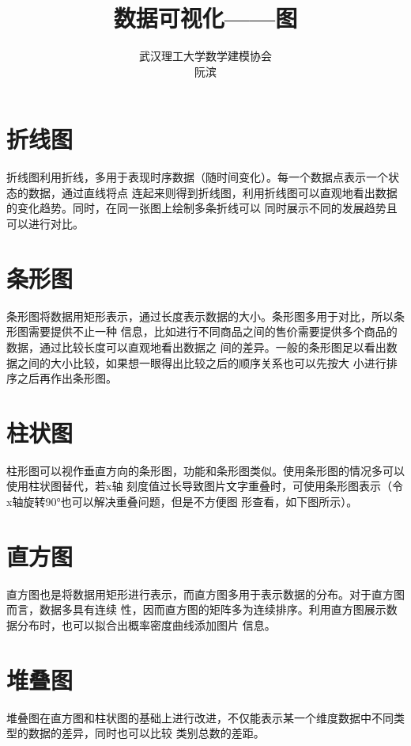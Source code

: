 \documentclass{introduction}
\title{数据可视化——图}
\date{}
\author{武汉理工大学数学建模协会\\阮滨}
\begin{document}
	\maketitle
	\tableofcontents

	\newpage
	\section{折线图}
	折线图利用折线，多用于表现时序数据（随时间变化）。每一个数据点表示一个状态的数据，通过直线将点
	连起来则得到折线图，利用折线图可以直观地看出数据的变化趋势。同时，在同一张图上绘制多条折线可以
	同时展示不同的发展趋势且可以进行对比。\parainterval
	\parainterval

	\section{条形图}
	条形图将数据用矩形表示，通过长度表示数据的大小。条形图多用于对比，所以条形图需要提供不止一种
	信息，比如进行不同商品之间的售价需要提供多个商品的数据，通过比较长度可以直观地看出数据之
	间的差异。一般的条形图足以看出数据之间的大小比较，如果想一眼得出比较之后的顺序关系也可以先按大
	小进行排序之后再作出条形图。\parainterval


	\section{柱状图}
	柱形图可以视作垂直方向的条形图，功能和条形图类似。使用条形图的情况多可以使用柱状图替代，若x轴
	刻度值过长导致图片文字重叠时，可使用条形图表示（令x轴旋转90°也可以解决重叠问题，但是不方便图
	形查看，如下图所示）。

	\section{直方图}
	直方图也是将数据用矩形进行表示，而直方图多用于表示数据的分布。对于直方图而言，数据多具有连续
	性，因而直方图的矩阵多为连续排序。利用直方图展示数据分布时，也可以拟合出概率密度曲线添加图片
	信息。\parainterval

	\section{堆叠图}
	堆叠图在直方图和柱状图的基础上进行改进，不仅能表示某一个维度数据中不同类型的数据的差异，同时也可以比较
	类别总数的差距。\parainterval 
	\parainterval
	
\end{document}
